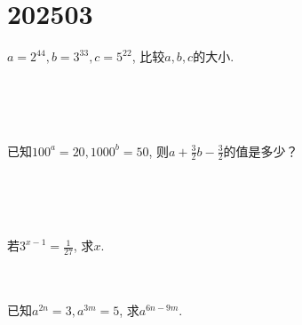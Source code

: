 \section{202503}

\item{
    $a=2^{44}, b=3^{33}, c=5^{22}$, 比较$a, b, c$的大小.
    \iffalse
    \fangsong\zihao{4}
    思路: 把指数化为一样,比较底数大小.

    解答: 
    \begin{align*}
        a &= (2^4)^{11} = 16^{11}\\
        b &= (3^3)^{11} = 27^{11}\\
        c &= (5^2)^{11} = 25^{11}\\
        & 16^{11} < 25^{11} < 27^{11}\\
        &\therefore a < c < b.
    \end{align*}
    \fi
}
\\ \\ \\
\item{
    已知$100^a=20, 1000^b=50$, 则$a+\frac{3}{2}b-\frac{3}{2}$的值是多少？
     \iffalse
     \fangsong\zihao{4}
     思路: 观察$100^a, 1000^b$ 发现 $a,b$都出现在指数上, 要求$a+\frac{3}{2}b-\frac{3}{2}$的值, 应该想到尝试把$a+\frac{3}{2}b-\frac{3}{2}$放在指数上.
 
     解答: 
     \begin{align*}
         100^{a+\frac{3}{2}b-\frac{3}{2}} &= \frac{100^a\cdot 100^{\frac{3}{2}b}}{100^\frac{3}{2}}\\
         &= \frac{100^a\cdot 10^{2\cdot \frac{3}{2}b}}{10^{2\cdot\frac{3}{2}}}\\
         &= \frac{100^a\cdot 10^{3b}} {10^{3}}\\
         &= \frac{100^a\cdot 1000^{b}} {1000}\\
         &= \frac{20\times 50} {1000}\\
         &= 1\\
         &\therefore a+\frac{3}{2}b-\frac{3}{2} = 0.
     \end{align*}
     \fi
}
\\ \\ \\
\item{
    若$3^{x-1}=\frac{1}{27}$, 求$x$.
}
\\ \\ \\
\item{
    已知$a^{2n}=3, a^{3m}=5$, 求$a^{6n-9m}$.
    \iffalse
    \fangsong\zihao{4}
    思路: 将$a^{6n-9m}$凑出$a^{2n}, a^{3m}$, 直接代入计算. 结果使用分数形式即可.

    解答: 
    \begin{align*}
        a^{6n-9m} &= \frac{a^{6n}}{a^{9m}}\\
        &= \frac{(a^{2n})^3} {(a^{3m})^3}\\
        &= \frac{3^3} {5^3}\\
        &= \frac{27} {125}.
    \end{align*}
    \fi
}
